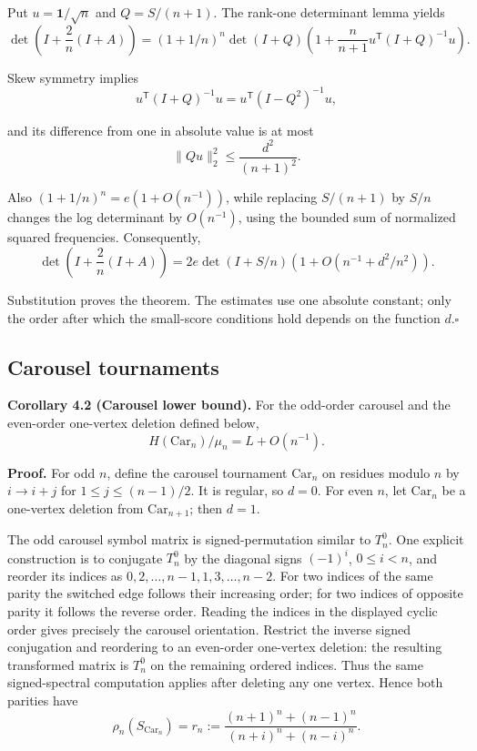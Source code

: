\documentclass[11pt,a4paper]{article}
\makeatletter
\newcommand{\paperstatement}[3]{\par\addvspace{6pt}\Needspace{4\baselineskip}\phantomsection\def\@currentlabel{#2}\label{#3}\noindent\textbf{#1}\enspace}
\makeatother
\begin{document}
Put \(u=\mathbf1/\sqrt n\) and \(Q=S/(n+1)\). The rank-one determinant lemma yields
\[\det\left(I+\frac2n(I+A)\right)
=(1+1/n)^n\det(I+Q)
\left(1+\frac n{n+1}u^{\mathsf T}(I+Q)^{-1}u\right).\]

Skew symmetry implies
\[u^{\mathsf T}(I+Q)^{-1}u=u^{\mathsf T}(I-Q^2)^{-1}u,\]

and its difference from one in absolute value is at most
\[\|Qu\|_2^2\le\frac{d^2}{(n+1)^2}.\]

Also \((1+1/n)^n=e(1+O(n^{-1}))\), while replacing \(S/(n+1)\) by \(S/n\) changes the log determinant by \(O(n^{-1})\), using the bounded sum of normalized squared frequencies. Consequently,
\[\det\left(I+\frac2n(I+A)\right)
=2e\det(I+S/n)\left(1+O(n^{-1}+d^2/n^2)\right).\]

Substitution proves the theorem. The estimates use one absolute constant; only the order after which the small-score conditions hold depends on the function \(d\).\nobreak\hspace{.5em}\mbox{$\square$}

\subsection{Carousel tournaments}\label{sec-4.2}

\paperstatement{Corollary 4.2 (Carousel lower bound).}{4.2}{thm-4.2} For the odd-order carousel and the even-order one-vertex deletion defined below,
\[H(\mathrm{Car}_n)/\mu_n=L+O(n^{-1}).\]

\textbf{Proof.} For odd \(n\), define the carousel tournament \(\mathrm{Car}_n\) on residues modulo \(n\) by \(i\to i+j\) for \(1\le j\le(n-1)/2\). It is regular, so \(d=0\). For even \(n\), let \(\mathrm{Car}_n\) be a one-vertex deletion from \(\mathrm{Car}_{n+1}\); then \(d=1\).

The odd carousel symbol matrix is signed-permutation similar to \(T_n^0\). One explicit construction is to conjugate \(T_n^0\) by the diagonal signs \((-1)^i\), \(0\le i<n\), and reorder its indices as \(0,2,\ldots,n-1,1,3,\ldots,n-2\). For two indices of the same parity the switched edge follows their increasing order; for two indices of opposite parity it follows the reverse order. Reading the indices in the displayed cyclic order gives precisely the carousel orientation. Restrict the inverse signed conjugation and reordering to an even-order one-vertex deletion: the resulting transformed matrix is \(T_n^0\) on the remaining ordered indices. Thus the same signed-spectral computation applies after deleting any one vertex. Hence both parities have
\[\rho_n(S_{\mathrm{Car}_n})
=r_n:=\frac{(n+1)^n+(n-1)^n}{(n+i)^n+(n-i)^n}.\]
\end{document}
